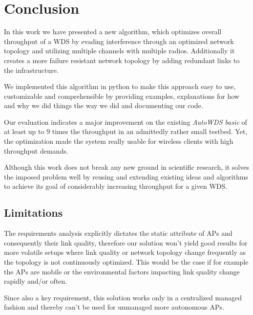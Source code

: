 \chapter{Conclusion}
  In this work we have presented a new algorithm, which optimizes overall throughput of a \ac{WDS} by evading interference through an optimized network topology 
  and utilizing multiple channels with multiple radios. Additionally it creates a more failure resistant network topology by adding redundant links to the infrastructure.
  
  We implemented this algorithm in python to make this approach easy to use, customizable and comprehensible by providing examples, 
  explanations for how and why we did things the way we did and documenting our code.
  
  Our evaluation indicates a major improvement on the existing \textit{AutoWDS basic} of at least up to 9 times the throughput in an admittedly rather small testbed.
  Yet, the optimization made the system really usable for wireless clients with high throughput demands.
  
  Although this work does not break any new ground in scientific research, it solves the imposed problem well by reusing and extending existing ideas and algorithms to
  achieve its goal of considerably increasing throughput for a given \ac{WDS}.
  
  \section{Limitations}
    The requirements analysis explicitly dictates the static attribute of APs and consequently their link quality, therefore our solution won't yield good 
    results for more volatile setups where link quality or network topology change frequently as the topology is not continuously optimized. 
    This would be the case if for example the APs are mobile or the environmental factors impacting link quality change rapidly and/or often.
    
    Since also a key requirement, this solution works only in a centralized managed fashion and thereby can't be used for unmanaged more autonomous APs.
    
